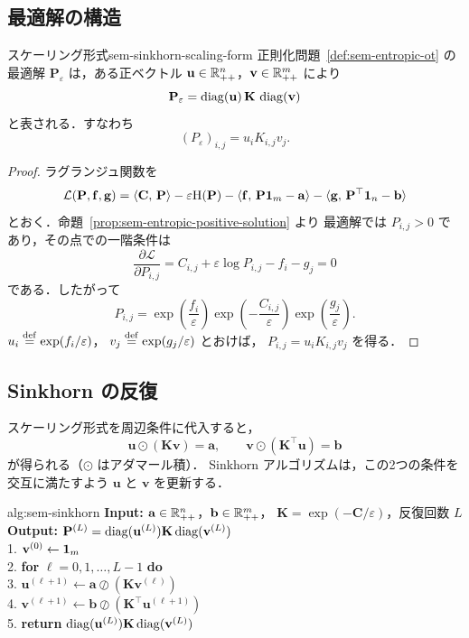 \subsection{最適解の構造}

\begin{theorem}{スケーリング形式}{sem-sinkhorn-scaling-form}
  正則化問題~\ref{def:sem-entropic-ot} の最適解
  $\mathbf{P}_\varepsilon$ は，ある正ベクトル
  $\mathbf{u} \in \mathbb{R}_{++}^{n}$，$\mathbf{v} \in \mathbb{R}_{++}^{m}$ により
  \[
    \mathbf{P}_\varepsilon
    =
    \operatorname{diag}(\mathbf{u})\,\mathbf{K}\,\operatorname{diag}(\mathbf{v})
  \]
  と表される．すなわち
  \[
    (P_\varepsilon)_{i,j} = u_i K_{i,j} v_j.
  \]
\end{theorem}

\begin{proof}
  ラグランジュ関数を
  \[
    \mathcal{L}(\mathbf{P},\mathbf{f},\mathbf{g})
    =
    \langle \mathbf{C},\, \mathbf{P} \rangle - \varepsilon\mathrm{H}(\mathbf{P})
    - \langle \mathbf{f},\, \mathbf{P}\mathbf{1}_m - \mathbf{a} \rangle
    - \langle \mathbf{g},\, \mathbf{P}^\top\mathbf{1}_n - \mathbf{b} \rangle
  \]
  とおく．命題~\ref{prop:sem-entropic-positive-solution} より
  最適解では $P_{i,j}>0$ であり，その点での一階条件は
  \[
    \frac{\partial \mathcal{L}}{\partial P_{i,j}}
    =
    C_{i,j} + \varepsilon\log P_{i,j} - f_i - g_j
    = 0
  \]
  である．したがって
  \[
    P_{i,j}
    =
    \exp\!\left(\frac{f_i}{\varepsilon}\right)
    \exp\!\left(-\frac{C_{i,j}}{\varepsilon}\right)
    \exp\!\left(\frac{g_j}{\varepsilon}\right).
  \]
  $u_i \overset{\mathrm{def}}{=} \exp(f_i/\varepsilon)$，
  $v_j \overset{\mathrm{def}}{=} \exp(g_j/\varepsilon)$ とおけば，
  $P_{i,j}=u_iK_{i,j}v_j$ を得る．
\end{proof}

\subsection{Sinkhorn の反復}

スケーリング形式を周辺条件に代入すると，
\[
  \mathbf{u} \odot (\mathbf{K}\mathbf{v}) = \mathbf{a},
  \qquad
  \mathbf{v} \odot (\mathbf{K}^\top\mathbf{u}) = \mathbf{b}
\]
が得られる（$\odot$ はアダマール積）．
Sinkhorn アルゴリズムは，この2つの条件を交互に満たすよう
$\mathbf{u}$ と $\mathbf{v}$ を更新する．

\begin{algorithm}{alg:sem-sinkhorn}
  \textbf{Input:}
  $\mathbf{a} \in \mathbb{R}_{++}^{n}$，$\mathbf{b} \in \mathbb{R}_{++}^{m}$，
  $\mathbf{K} = \exp(-\mathbf{C}/\varepsilon)$，反復回数 $L$ \\
  \textbf{Output:}
  $\mathbf{P}^{(L)} = \operatorname{diag}(\mathbf{u}^{(L)})\mathbf{K}\operatorname{diag}(\mathbf{v}^{(L)})$ \\[4pt]
  1. $\mathbf{v}^{(0)} \leftarrow \mathbf{1}_m$ \\
  2. \textbf{for} $\ell = 0,1,\ldots,L-1$ \textbf{do} \\
  3. \quad $\mathbf{u}^{(\ell+1)}
      \leftarrow \mathbf{a} \oslash (\mathbf{K}\mathbf{v}^{(\ell)})$ \\
  4. \quad $\mathbf{v}^{(\ell+1)}
      \leftarrow \mathbf{b} \oslash (\mathbf{K}^\top\mathbf{u}^{(\ell+1)})$ \\
  5. \textbf{return}
      $\operatorname{diag}(\mathbf{u}^{(L)})\mathbf{K}\operatorname{diag}(\mathbf{v}^{(L)})$
\end{algorithm}

